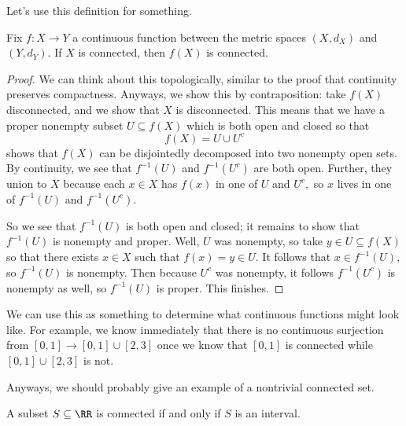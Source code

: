 \documentclass[../notes.tex]{subfiles}
\begin{document}
Let's use this definition for something.
\begin{proposition}
	Fix $f:X\to Y$ a continuous function between the metric spaces $(X,d_X)$ and $(Y,d_Y).$ If $X$ is connected, then $f(X)$ is connected.
\end{proposition}
\begin{proof}
	We can think about this topologically, similar to the proof that continuity preserves compactness. Anyways, we show this by contraposition: take $f(X)$ disconnected, and we show that $X$ is disconnected. This means that we have a proper nonempty subset $U\subseteq f(X)$ which is both open and closed so that
	\[f(X)=U\cup U^c\]
	shows that $f(X)$ can be disjointedly decomposed into two nonempty open sets. By continuity, we see that $f^{-1}(U)$ and $f^{-1}(U^c)$ are both open. Further, they union to $X$ because each $x\in X$ has $f(x)$ in one of $U$ and $U^c,$ so $x$ lives in one of $f^{-1}(U)$ and $f^{-1}(U^c).$

	So we see that $f^{-1}(U)$ is both open and closed; it remains to show that $f^{-1}(U)$ is nonempty and proper. Well, $U$ was nonempty, so take $y\in U\subseteq f(X)$ so that there exists $x\in X$ such that $f(x)=y\in U.$ It follows that $x\in f^{-1}(U),$ so $f^{-1}(U)$ is nonempty. Then because $U^c$ was nonempty, it follows $f^{-1}(U^c)$ is nonempty as well, so $f^{-1}(U)$ is proper. This finishes.
\end{proof}
\begin{remark}
	We can use this as something to determine what continuous functions might look like. For example, we know immediately that there is no continuous surjection from $[0,1]\to[0,1]\cup[2,3]$ once we know that $[0,1]$ is connected while $[0,1]\cup[2,3]$ is not.
\end{remark}
Anyways, we should probably give an example of a nontrivial connected set.
\begin{proposition}
	A subset $S\subseteq\RR$ is connected if and only if $S$ is an interval.
\end{proposition}
\end{document}

